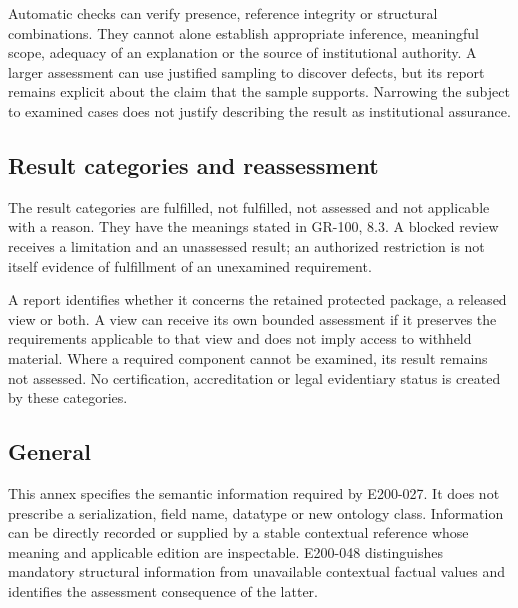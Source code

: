\documentclass[11pt,a4paper]{article}
\begin{document}
Automatic checks can verify presence, reference integrity or structural combinations. They cannot alone establish appropriate inference, meaningful scope, adequacy of an explanation or the source of institutional authority. A larger assessment can use justified sampling to discover defects, but its report remains explicit about the claim that the sample supports. Narrowing the subject to examined cases does not justify describing the result as institutional assurance.

\subsection{Result categories and reassessment}
The result categories are fulfilled, not fulfilled, not assessed and not applicable with a reason. They have the meanings stated in GR-100, 8.3. A blocked review receives a limitation and an unassessed result; an authorized restriction is not itself evidence of fulfillment of an unexamined requirement.


A report identifies whether it concerns the retained protected package, a released view or both. A view can receive its own bounded assessment if it preserves the requirements applicable to that view and does not imply access to withheld material. Where a required component cannot be examined, its result remains not assessed. No certification, accreditation or legal evidentiary status is created by these categories.
\subsection{General}
This annex specifies the semantic information required by E200-027. It does not prescribe a serialization, field name, datatype or new ontology class. Information can be directly recorded or supplied by a stable contextual reference whose meaning and applicable edition are inspectable. E200-048 distinguishes mandatory structural information from unavailable contextual factual values and identifies the assessment consequence of the latter.
\end{document}

